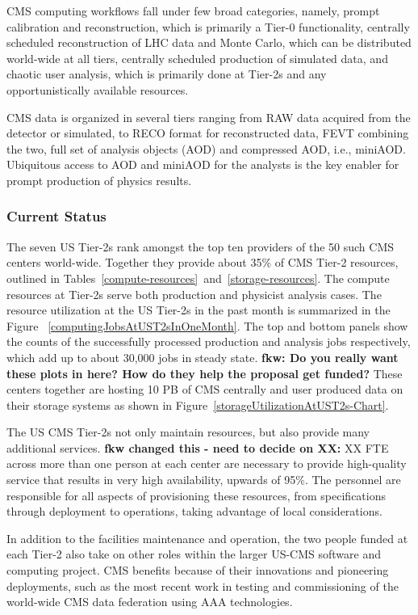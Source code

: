\documentclass[11pt,a4paper]{article}
\begin{document}
CMS computing workflows fall under few broad categories, namely, prompt
calibration and reconstruction, which is primarily a Tier-0 functionality, 
centrally scheduled reconstruction of LHC data and Monte Carlo, which 
can be distributed world-wide at all tiers, centrally scheduled production 
of simulated data, and chaotic user analysis, which is primarily done at 
Tier-2s and any opportunistically available resources.

CMS data is organized in several tiers ranging from RAW data acquired
from the detector or simulated, to RECO format for reconstructed data, 
FEVT combining the two, full set of analysis objects (AOD) and 
compressed AOD, i.e., miniAOD. Ubiquitous access to AOD and miniAOD 
for the analysts is the key enabler for prompt production of physics
results.

\subsubsection{Current Status}

The seven US Tier-2s rank amongst the top ten providers of the 50 such 
CMS centers world-wide. Together they provide about 35\% of CMS
Tier-2 resources, outlined in Tables~\ref{compute-resources}~and~\ref{storage-resources}.  
The compute resources at Tier-2s serve both production and physicist analysis cases.  The resource utilization
at the US Tier-2s in the past month is summarized in the Figure~
\ref{computingJobsAtUST2sInOneMonth}. The top and bottom panels
show the counts of the successfully processed production and analysis 
jobs respectively, which add up to about 30,000 jobs in steady state.
{\bf fkw: Do you really want these plots in here? How do they help the proposal get funded?}
These centers together are hosting 10 PB of CMS centrally and
user produced data on their storage systems as shown in 
Figure~\ref{storageUtilizationAtUST2s-Chart}.

The US CMS Tier-2s not only maintain resources, but
also provide many additional services.  {\bf fkw changed this - need to decide on XX:} XX FTE across more than one person at each center
are necessary to provide high-quality service that results in 
very high availability, upwards of 95\%. The personnel are responsible
for all aspects of provisioning these resources, from specifications through
deployment to operations, taking advantage of local considerations. 

In addition to the facilities maintenance and operation, the two people funded at each Tier-2 also take 
on other roles within the larger US-CMS software and computing project.  CMS benefits
because of their innovations and pioneering deployments, such as
the most recent work in testing and commissioning of the world-wide
CMS data federation using AAA technologies.
\end{document}
